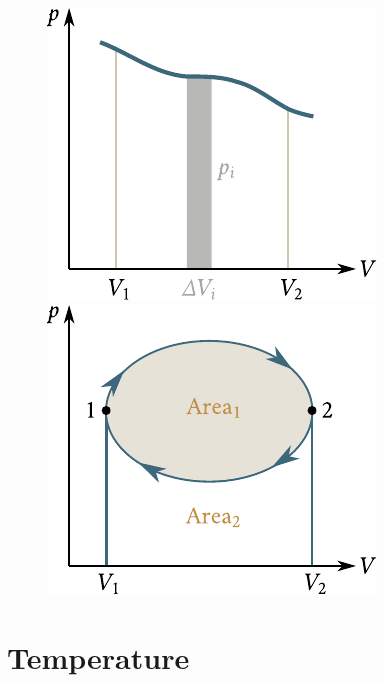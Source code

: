 \begin{figure}[t]
	\begin{minipage}[t]{0.5\linewidth}
		\begin{center}
			\includegraphics[scale=1.0]{figures/ch_10/fig_10_4.pdf}
			\caption[]{}
			\label{fig:10_4}
		\end{center}
	\end{minipage}
	\hspace{-0.0cm}
	\begin{minipage}[t]{0.5\linewidth}
		\begin{center}
			\includegraphics[scale=1.0]{figures/ch_10/fig_10_5.pdf}
			\caption[]{}
			\label{fig:10_5}
		\end{center}
	\end{minipage}
	\vspace{-0.4cm}
\end{figure}

\section{Temperature}\label{sec:10_7}

